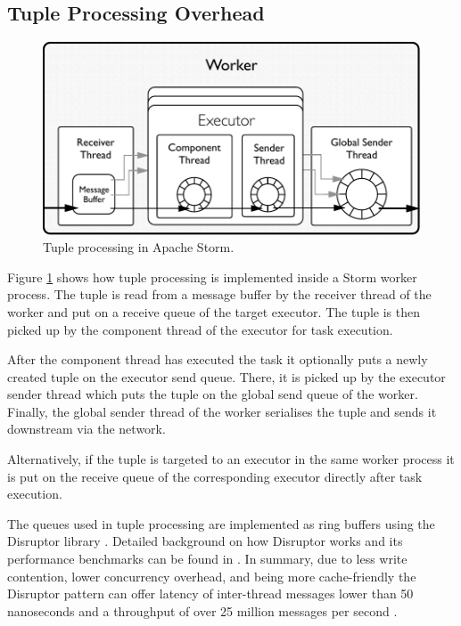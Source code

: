 \documentclass[bsc,twoside,singlespacing,normalheadings,parskip]{infthesis}\usepackage[]{graphicx}\usepackage[]{color}
\begin{document}
\subsection{Tuple Processing Overhead}

\begin{figure}[!htb]
	\centering
	\includegraphics[scale=0.7]{pdf/worker_inside.pdf}
	\caption{Tuple processing in Apache Storm.}
	\label{fig:worker_inside}
\end{figure}

Figure \ref{fig:worker_inside} shows how tuple processing is implemented inside a Storm worker process. The tuple is read from a message buffer by the receiver thread of the worker and put on a receive queue of the target executor. The tuple is then picked up by the component thread of the executor for task execution.

After the component thread has executed the task it optionally puts a newly created tuple on the executor send queue. There, it is picked up by the executor sender thread which puts the tuple on the global send queue of the worker. Finally, the global sender thread of the worker serialises the tuple and sends it downstream via the network.

Alternatively, if the tuple is targeted to an executor in the same worker process it is put on the receive queue of the corresponding executor directly after task execution.

The queues used in tuple processing are implemented as ring buffers using the Disruptor library \citep{LMAXDisruptor}. Detailed background on how Disruptor works and its performance benchmarks can be found in \citep{Thompson_Farley_Barker_Gee_Stewart_2011}. In summary, due to less write contention, lower concurrency overhead, and being more cache-friendly the Disruptor pattern can offer latency of inter-thread messages lower than 50 nanoseconds and a throughput of over 25 million messages per second \cite{Thompson_Farley_Barker_Gee_Stewart_2011}.
\end{document}
